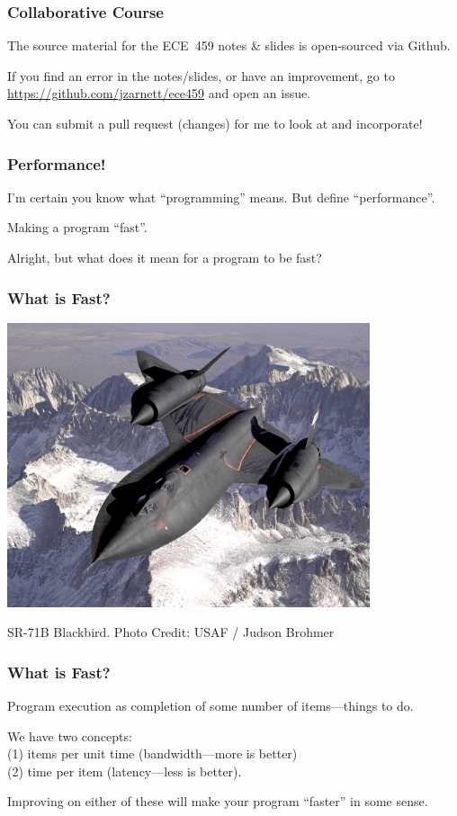 \begin{frame}
\frametitle{Collaborative Course}

The source material for the ECE~459 notes \& slides is open-sourced via Github. 

If you find an error in the notes/slides, or have an improvement, go to \url{https://github.com/jzarnett/ece459} and open an issue. 

You can submit a pull request (changes) for me to look at and incorporate!

\end{frame}



\begin{frame}
\frametitle{Performance!}

I'm certain you know what ``programming'' means. But define ``performance''. 

Making a program ``fast''. 

Alright, but what does it mean for a program to be fast?


\end{frame}

\begin{frame}
\frametitle{What is Fast?}

\begin{center}
\includegraphics[width=0.8\textwidth]{images/blackbird.jpg}
\end{center}
\hfill SR-71B Blackbird. Photo Credit: USAF / Judson Brohmer
\end{frame}

\begin{frame}
\frametitle{What is Fast?}

Program execution as completion of some number of items---things to do. 

We have two concepts:\\
\quad (1) items per unit time (bandwidth---more is better)\\
\quad (2) time per item (latency---less is better). 

Improving on either of these will make your program ``faster'' in some sense.

\end{frame}

